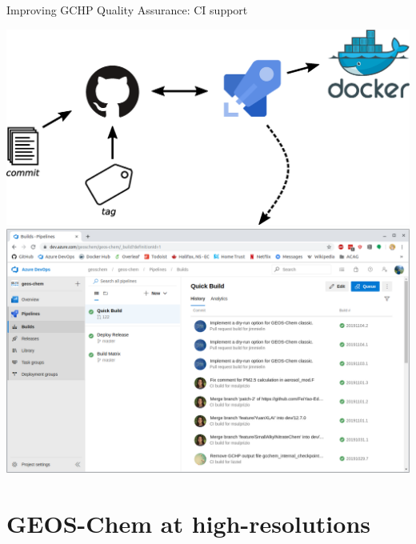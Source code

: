 \documentclass[10pt]{beamer}
\begin{document}
\begin{frame}[fragile]{Improving GCHP Quality Assurance: CI support}
    \begin{center}
        \includegraphics[height=0.3\textheight]{pipeline.eps}
        \vfill
        \includegraphics[height=0.5\textheight]{CI.png}
    \end{center}
\end{frame}

\section{GEOS-Chem at high-resolutions}
\end{document}
